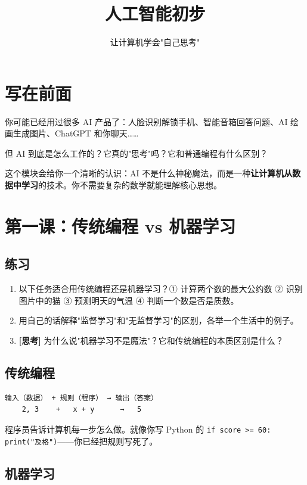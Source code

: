 \documentclass[a4paper,12pt]{ctexart}
\title{\textcolor{blue!70!black}{\Huge\textbf{人工智能初步}}}
\author{让计算机学会"自己思考"}
\date{}
\begin{document}
\maketitle
\thispagestyle{empty}

\section*{写在前面}

你可能已经用过很多 AI 产品了：人脸识别解锁手机、智能音箱回答问题、AI 绘画生成图片、ChatGPT 和你聊天……

但 AI 到底是怎么工作的？它真的"思考"吗？它和普通编程有什么区别？

这个模块会给你一个清晰的认识：AI 不是什么神秘魔法，而是一种\textbf{让计算机从数据中学习}的技术。你不需要复杂的数学就能理解核心思想。

\section*{第一课：传统编程 vs 机器学习}

\subsection*{练习}

\begin{enumerate}
  \item 以下任务适合用传统编程还是机器学习？① 计算两个数的最大公约数 ② 识别图片中的猫 ③ 预测明天的气温 ④ 判断一个数是否是质数。
  \item 用自己的话解释"监督学习"和"无监督学习"的区别，各举一个生活中的例子。
  \item \textbf{[思考]} 为什么说"机器学习不是魔法"？它和传统编程的本质区别是什么？
\end{enumerate}

\subsection*{传统编程}

\begin{verbatim}
输入（数据） + 规则（程序） → 输出（答案）
    2, 3    +   x + y      →   5
\end{verbatim}

程序员告诉计算机每一步怎么做。就像你写 Python 的 \texttt{if score >= 60: print("及格")}——你已经把规则写死了。

\subsection*{机器学习}
\end{document}
